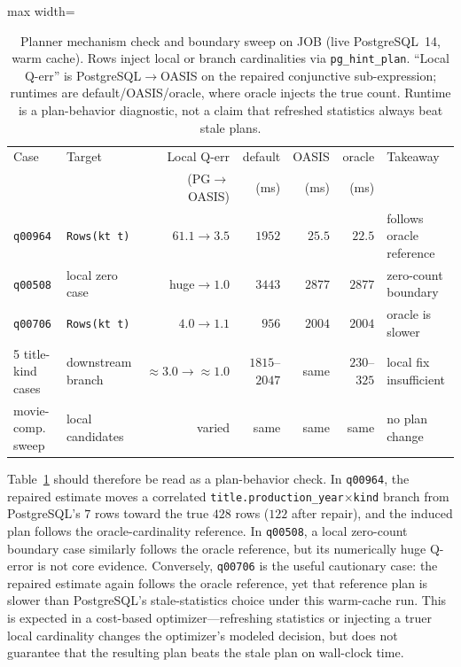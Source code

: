 \documentclass[preprint,12pt]{elsarticle}
\begin{document}
\begin{table}[t]
  \centering\small
  \caption{Planner mechanism check and boundary sweep on JOB (live PostgreSQL~14, warm cache).
  Rows inject local or branch cardinalities via \texttt{pg\_hint\_plan}. ``Local Q-err'' is
  PostgreSQL$\to$OASIS on the repaired conjunctive sub-expression; runtimes are
  default/OASIS/oracle, where oracle injects the true count. Runtime is a plan-behavior
  diagnostic, not a claim that refreshed statistics always beat stale plans.}
  \label{tab:plan_level_job}
  \setlength{\tabcolsep}{3.5pt}
  \begin{adjustbox}{max width=\columnwidth}
  \begin{tabular}{l l r r r r l}
    \toprule
    Case & Target & Local Q-err & default & OASIS & oracle & Takeaway \\
         &        & (PG$\to$OASIS) & (ms) & (ms) & (ms) & \\
    \midrule
    \texttt{q00964} & \texttt{Rows(kt t)} & $61.1\to3.5$ & $1952$ & $25.5$ & $22.5$ & follows oracle reference \\
    \texttt{q00508} & local zero case & huge$\to1.0$ & $3443$ & $2877$ & $2877$ & zero-count boundary \\
    \texttt{q00706} & \texttt{Rows(kt t)} & $4.0\to1.1$ & $956$ & $2004$ & $2004$ & oracle is slower \\
    5 title-kind cases & downstream branch & $\approx3.0\to\approx1.0$ & $1815$--$2047$ & same & $230$--$325$ & local fix insufficient \\
    movie-comp. sweep & local candidates & varied & same & same & same & no plan change \\
    \bottomrule
  \end{tabular}
  \end{adjustbox}
\end{table}

Table~\ref{tab:plan_level_job} should therefore be read as a plan-behavior check. In
\texttt{q00964}, the repaired estimate moves a correlated
\texttt{title.production\_year}$\times$\texttt{kind} branch from PostgreSQL's $7$ rows toward
the true $428$ rows ($122$ after repair), and the induced plan follows the oracle-cardinality
reference. In \texttt{q00508}, a local zero-count boundary case similarly follows the oracle
reference, but its numerically huge Q-error is not core evidence. Conversely,
\texttt{q00706} is the useful cautionary case: the repaired estimate again follows the oracle
reference, yet that reference plan is slower than PostgreSQL's stale-statistics choice under
this warm-cache run. This is expected in a cost-based optimizer---refreshing statistics or
injecting a truer local cardinality changes the optimizer's modeled decision, but does not
guarantee that the resulting plan beats the stale plan on wall-clock time.
\end{document}
